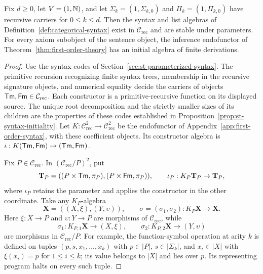 \begin{proposition}\label{prop:arithmetic-theory-realization}
Fix $d\ge0$, let $V=(1,\mathbb N)$, and let
$\Sigma_k=(1,\Sigma_{k,0})$ and $\Pi_k=(1,\Pi_{k,0})$
have recursive carriers for $0\le k\le d$. Then the
syntax and list algebras of Definition~\ref{def:categorical-syntax}
exist in $\mathcal C_{\mathrm{rec}}$ and are stable under parameters.
For every axiom subobject of the sentence object, the inference
endofunctor of Theorem~\ref{thm:first-order-theory} has an initial
algebra of finite derivations.
\end{proposition}
\begin{proof}
Use the syntax codes of Section~\ref{sec:st-parameterized-syntax}.
The primitive recursion recognizing finite syntax trees, membership
in the recursive signature objects, and numerical equality decide the carriers
of objects $\mathsf{Tm},\mathsf{Fm}\in\mathcal C_{\mathrm{rec}}$. Each constructor is a primitive-recursive
function on its displayed source. The unique root decomposition
and the strictly smaller sizes of its children are the properties
of these codes established in Proposition~\ref{prop:st-syntax-initiality}.
Let $K:\mathcal C_{\mathrm{rec}}^2\to\mathcal C_{\mathrm{rec}}^2$
be the endofunctor of Appendix~\ref{app:first-order-syntax}, with
these coefficient objects. Its constructor algebra is
$\iota:K(\mathsf{Tm},\mathsf{Fm})\to(\mathsf{Tm},\mathsf{Fm})$.

Fix $P\in\mathcal C_{\mathrm{rec}}$. In
$(\mathcal C_{\mathrm{rec}}/P)^2$, put
\[
 \mathbf T_P=((P\times\mathsf{Tm},\pi_P),(P\times\mathsf{Fm},\pi_P)),
 \qquad \iota_P:K_P\mathbf T_P\to\mathbf T_P,
\]
where $\iota_P$ retains the parameter and applies the constructor
in the other coordinate. Take any $K_P$-algebra
\[
 \mathbf X=((X,\xi),(Y,\upsilon)),\qquad
 \sigma=(\sigma_1,\sigma_2):K_P\mathbf X\to\mathbf X.
\]
Here $\xi:X\to P$ and $\upsilon:Y\to P$ are morphisms of
$\mathcal C_{\mathrm{rec}}$, while
\[
 \sigma_1:K_{P,1}\mathbf X\to(X,\xi),\qquad
 \sigma_2:K_{P,2}\mathbf X\to(Y,\upsilon)
\]
are morphisms in $\mathcal C_{\mathrm{rec}}/P$.
For example, the function-symbol operation at arity $k$ is defined
on tuples $(p,s,x_1,\ldots,x_k)$ with $p\in|P|$,
$s\in|\Sigma_k|$, and $x_i\in|X|$ with $\xi(x_i)=p$
for $1\le i\le k$; its value belongs to $|X|$ and lies
over $p$. Its representing program halts on every such tuple.


\end{proof}
